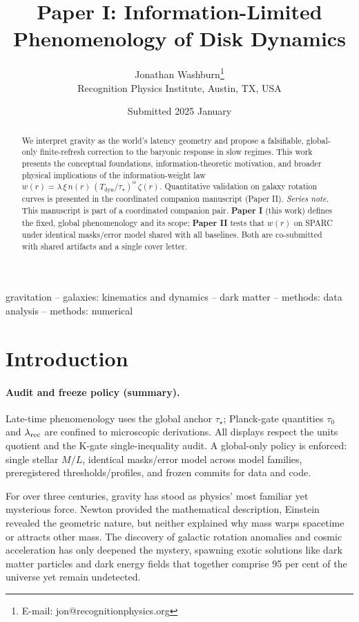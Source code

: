 \documentclass[usenatbib]{mnras}
\title[Information-Limited Phenomenology of Disk Dynamics]{Paper I: Information-Limited Phenomenology of Disk Dynamics}
\author[J. Washburn]{Jonathan Washburn\thanks{E-mail: jon@recognitionphysics.org}\\
Recognition Physics Institute, Austin, TX, USA
}
\date{Submitted 2025 January}
\begin{document}
\maketitle

\begin{abstract}
We interpret gravity as the world's latency geometry and propose a falsifiable, global-only finite-refresh correction to the baryonic response in slow regimes. This work presents the conceptual foundations, information-theoretic motivation, and broader physical implications of the information-weight law $w(r)=\lambda\,\xi\,n(r)\,(T_{\text{dyn}}/\tau_\star)^\alpha\,\zeta(r)$. Quantitative validation on galaxy rotation curves is presented in the coordinated companion manuscript (Paper II).
\vspace{0.5em}
\noindent\textit{Series note.} This manuscript is part of a coordinated companion pair. \textbf{Paper I} (this work) defines the fixed, global phenomenology and its scope; \textbf{Paper II} tests that $w(r)$ on SPARC under identical masks/error model shared with all baselines. Both are co-submitted with shared artifacts and a single cover letter.
\end{abstract}

\begin{keywords}
gravitation -- galaxies: kinematics and dynamics -- dark matter -- methods: data analysis -- methods: numerical
\end{keywords}

\section{Introduction}
\paragraph*{Audit and freeze policy (summary).}
Late-time phenomenology uses the global anchor $\tau_\star$; Planck-gate quantities $\tau_0$ and $\lambda_{\rm rec}$ are confined to microscopic derivations. All displays respect the units quotient and the K-gate single-inequality audit. A global-only policy is enforced: single stellar $M/L$, identical masks/error model across model families, preregistered thresholds/profiles, and frozen commits for data and code.

For over three centuries, gravity has stood as physics' most familiar yet mysterious force. Newton provided the mathematical description, Einstein revealed the geometric nature, but neither explained why mass warps spacetime or attracts other mass. The discovery of galactic rotation anomalies \citep{Rubin1970} and cosmic acceleration \citep{Riess1998} has only deepened the mystery, spawning exotic solutions like dark matter particles and dark energy fields that together comprise 95 per cent of the universe yet remain undetected.
\end{document}
